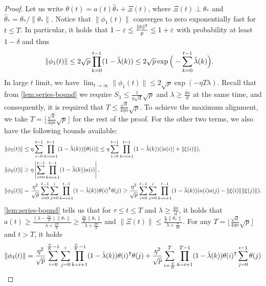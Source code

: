 \begin{proof}
    Let us write $\theta(t) = a(t) \hat\theta_\ast + \Xi(t)$, where $\Xi(t)\perp\theta_\ast$ and $\hat\theta_* = \theta_*/\|\theta_*\|$. Notice that $\|\phi_{1}(t)\|$ converges to zero exponentially fast for $t\leq T$. In particular, it holds that $1-\varepsilon \leq \frac{\|b\|^2}{p} \leq 1+\varepsilon$ with probability at least $1-\delta$ and thus
    \begin{align*}
        \|\phi_{1}(t)\| & \leq 2\sqrt p \prod_{k=0}^{t-1}(1-\tilde{\lambda}(k)) \leq 2\sqrt p \exp\Big(-\sum_{k=0}^{t-1}\tilde{\lambda}(k)\Big).
    \end{align*} 
    In large $t$ limit, we have $\lim_{t\to\infty}\|\phi_{1}(t)\| \leq 2\sqrt p \exp(-\eta T\lambda)$. Recall that from \cref{lem:series-bound} we require $S_\lambda\leq \frac{1}{\eta\sqrt{d}}\sqrt{p}$ and $\lambda\geq \frac{4n}{d}$ at the same time, and consequently, it is required that $T\leq \frac{\sqrt{d}}{4\eta n}\sqrt{p}$. To achieve the maximum alignment, we take $T=\lfloor \frac{\sqrt{d}}{4\eta n}\sqrt{p} \rfloor$ for the rest of the proof.
    For the other two terms, we also have the following bounds available:
    \begin{align*}
        \|\phi_{2}(t)\| &\leq \eta\sum_{i=0}^{t-1}\prod_{k=i+1}^{t-1}(1-\tlam(k))\|\theta(i)\| 
        \leq \eta\sum_{i=0}^{t-1}\prod_{k=i+1}^{t-1}(1-\tlam(k))(|a(i)|+\|\xi(i)\|), \\
        \|\phi_{2}(t)\| &\geq \eta\left|\sum_{i=0}^{t-1}\prod_{k=i+1}^{t-1}(1-\tlam(k))a(i)\right|, \\
        \|\phi_{3}(t)\| &= \frac{\eta^2}{\sqrt p}\sum_{i=0}^{t-1}\sum_{j=0}^i\prod_{k=i+1}^{t-1}(1-\tlam(k))\theta(i)\transpose \theta(j) \geq \frac{\eta^2}{\sqrt p}\sum_{i=0}^{t-1}\sum_{j=0}^i\prod_{k=i+1}^{t-1}(1-\tlam(k))(a(i)a(j)-\|\xi(i)\|\|\xi(j)\|).
    \end{align*}
    \cref{lem:series-bound} tells us that for $\tau \leq t \leq T$ and $\lambda \geq \frac{4n}{d}$, it holds that $a(t)\geq \frac{(\lambda - \frac{2n}{d})\|\theta_*\|}{\lambda + \frac{2n}{d}} \geq \frac{\frac{2n}{d}\|\theta_*\|}{\lambda + \frac{2n}{d}}$ and $\|\Xi(t)\|\leq \frac{\frac{n}{d}\|\theta_*\|}{\lambda + \frac{n}{2d}}$.
    For any $T = \lfloor \frac{\sqrt{d}}{4\eta n}\sqrt{p} \rfloor$ and $t>T$, it holds
    \begin{align*}
        \|\phi_{3}(t)\| 
        & = \frac{\eta^2}{\sqrt p}\sum_{i=0}^{\frac{T}{K}-1}\sum_{j=0}^i\prod_{k=i+1}^{\frac{T}{K}-1}(1-\tlam(k))\theta(i)\transpose\theta(j) + \frac{\eta^2}{\sqrt p}\sum_{i=\frac{T}{K}}^{T}\prod_{k=i+1}^{T-1}(1-\tlam(k))\theta(i)\transpose\sum_{j=0}^{i-1} \theta(j) \\

\end{align*}
\end{proof}
